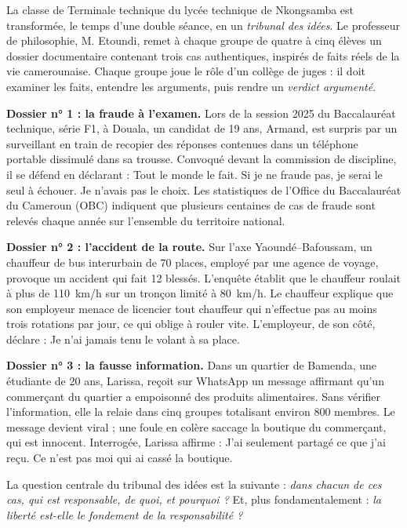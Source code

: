 \documentclass[11pt]{article}
\newcounter{popsec}
\newcounter{popsub}
\newcommand{\courssub}[1]{%
  \stepcounter{popsub}%
  \par\vspace{9pt}\noindent{\popxbold\fontsize{11.5}{13}\selectfont\color{popink}{\color{poporange}\thepopsec.\thepopsub}\hspace{6pt}#1}\par\nopagebreak\vspace{4pt}
}
\begin{document}
\courssub{Situation}

La classe de Terminale technique du lycée technique de Nkongsamba est transformée, le temps d'une double séance, en un \emph{tribunal des idées}. Le professeur de philosophie, M. Etoundi, remet à chaque groupe de quatre à cinq élèves un dossier documentaire contenant trois cas authentiques, inspirés de faits réels de la vie camerounaise. Chaque groupe joue le rôle d'un collège de juges : il doit examiner les faits, entendre les arguments, puis rendre un \emph{verdict argumenté}.

\textbf{Dossier n° 1 : la fraude à l'examen.} Lors de la session 2025 du Baccalauréat technique, série F1, à Douala, un candidat de 19 ans, Armand, est surpris par un surveillant en train de recopier des réponses contenues dans un téléphone portable dissimulé dans sa trousse. Convoqué devant la commission de discipline, il se défend en déclarant : \og Tout le monde le fait. Si je ne fraude pas, je serai le seul à échouer. Je n'avais pas le choix. \fg{} Les statistiques de l'Office du Baccalauréat du Cameroun (OBC) indiquent que plusieurs centaines de cas de fraude sont relevés chaque année sur l'ensemble du territoire national.

\textbf{Dossier n° 2 : l'accident de la route.} Sur l'axe Yaoundé--Bafoussam, un chauffeur de bus interurbain de 70 places, employé par une agence de voyage, provoque un accident qui fait 12 blessés. L'enquête établit que le chauffeur roulait à plus de \SI{110}{km/h} sur un tronçon limité à \SI{80}{km/h}. Le chauffeur explique que son employeur menace de licencier tout chauffeur qui n'effectue pas au moins trois rotations par jour, ce qui oblige à rouler vite. L'employeur, de son côté, déclare : \og Je n'ai jamais tenu le volant à sa place. \fg{}

\textbf{Dossier n° 3 : la fausse information.} Dans un quartier de Bamenda, une étudiante de 20 ans, Larissa, reçoit sur WhatsApp un message affirmant qu'un commerçant du quartier a empoisonné des produits alimentaires. Sans vérifier l'information, elle la relaie dans cinq groupes totalisant environ 800 membres. Le message devient viral ; une foule en colère saccage la boutique du commerçant, qui est innocent. Interrogée, Larissa affirme : \og J'ai seulement partagé ce que j'ai reçu. Ce n'est pas moi qui ai cassé la boutique. \fg{}

La question centrale du tribunal des idées est la suivante : \emph{dans chacun de ces cas, qui est responsable, de quoi, et pourquoi ?} Et, plus fondamentalement : \emph{la liberté est-elle le fondement de la responsabilité ?}
\end{document}
